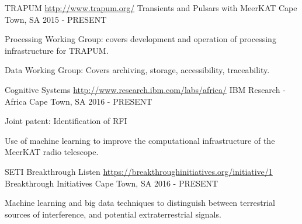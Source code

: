\begin{cventries}
  \cventry
  	{TRAPUM \url{http://www.trapum.org/}}
    {Transients and Pulsars with MeerKAT}
    {Cape Town, SA}
    {2015 - PRESENT}
    {
      \begin{cvitems}
        \item {Processing Working Group: covers development and operation of processing infrastructure for TRAPUM.}
        \item {Data Working Group: Covers archiving, storage, accessibility, traceability.}
      \end{cvitems}
    }
  \cventry
    {Cognitive Systems \url{http://www.research.ibm.com/labs/africa/}}
    {IBM Research - Africa}
    {Cape Town, SA}
    {2016 - PRESENT}
    {
      \begin{cvitems}
        \item {Joint patent: Identification of RFI}
        \item {Use of machine learning to improve the computational infrastructure of the MeerKAT radio telescope.}
      \end{cvitems}
    }
  \cventry
    {SETI Breakthrough Listen \url{https://breakthroughinitiatives.org/initiative/1}}
    {Breakthrough Initiatives}
    {Cape Town, SA}
    {2016 - PRESENT}
    {
     \begin{cvitems}
      \item {Machine learning and big data techniques to distinguish between terrestrial sources of interference, and potential extraterrestrial signals.}
     \end{cvitems}
    }
\end{cventries}
